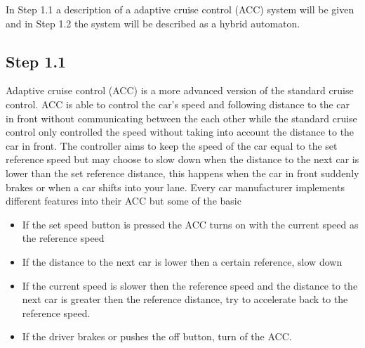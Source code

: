 In Step 1.1 a description of a adaptive cruise control (ACC) system will be given and in Step 1.2 the system will be described as a hybrid automaton. 

\subsection*{Step 1.1}
Adaptive cruise control (ACC) is a more advanced version of the standard cruise control. ACC is able to control the car's speed and following distance to the car in front without communicating between the each other while the standard cruise control only controlled the speed without taking into account the distance to the car in front. The controller aims to keep the speed of the car equal to the set reference speed but may choose to slow down when the distance to the next car is lower than the set reference distance, this happens when the car in front suddenly brakes or when a car shifts into your lane.
Every car manufacturer implements different features into their ACC but some of the basic%
\begin{itemize}
    
    \item If the set speed button is pressed the ACC turns on with the current speed as the reference speed
    \item If the distance to the next car is lower then a certain reference, slow down
    \item If the current speed is slower then the reference speed and the distance to the next car is greater then the reference distance, try to accelerate back to the reference speed.
    \item If the driver brakes or pushes the off button, turn of the ACC.
\end{itemize}
